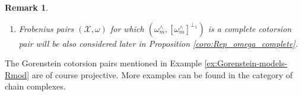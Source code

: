 \documentclass[10pt,reqno]{amsart}
\numberwithin{equation}{section}
\newtheorem{remark}[definition]{Remark}
\theoremstyle{remark}
\newcommand{\C}{\mathfrak{C}}
\begin{document}
\begin{remark}
\begin{enumerate}[(1)]
A complete cotorsion pair $(\mathcal{X},\mathcal{X}^{\perp_1})$ in an abelian category $\C$ with enough projective objects is called \textbf{projective} if $\mathcal{X} \cap \mathcal{X}^{\perp_1}$ is the class of projective objects and $\mathcal{X}^{\perp_1}$ is thick. Besides \cite{BeligiannisReiten}, these pairs have also been considered in other parts of the literature, like for instance in \cite{GillespieAdvances}, where the author proves a complete description for them in Proposition 3.7. 

\item Frobenius pairs $(\mathcal{X},\omega)$ for which $(\omega^\wedge_m,[\omega^\wedge_m]^{\perp_1})$ is a complete cotorsion pair will be also considered later in Proposition \ref{coro:Rep_omega_complete}.
\end{enumerate}
\end{remark}


The Gorenstein cotorsion pairs mentioned in Example \ref{ex:Gorenstein-models-Rmod} are of course projective. More examples can be found in the category of chain complexes. 
\end{document}
